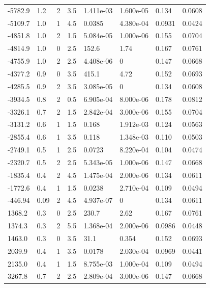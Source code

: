 \documentclass[preview]{standalone}
\begin{document}
{{\begin{tabular}{L{1.2cm}C{1.2cm} C{0.3cm}C{0.5cm} C{1.4cm}C{1.4cm} C{1.4cm}C{1.4cm}}
  -5782.9  &   1.2  & 2     & 3.5 &  1.411e-03  & 1.600e-05  & 0.134 &  0.0608   \\ 
  -5109.7  &   1.0  & 1     & 4.5 &  0.0385  & 4.380e-04  & 0.0931 &  0.0424   \\ 
  -4851.8  &   1.0  & 2     & 1.5 &  5.084e-05  & 1.000e-06  & 0.155 &  0.0704   \\ 
  -4814.9  &   1.0  & 0     & 2.5 &  152.6  & 1.74  & 0.167 &  0.0761   \\ 
  -4755.9  &   1.0  & 2     & 2.5 &  4.408e-06  & 0  & 0.147 &  0.0668   \\ 
  -4377.2  &   0.9  & 0     & 3.5 &  415.1  & 4.72  & 0.152 &  0.0693   \\ 
  -4285.5  &   0.9  & 2     & 3.5 &  3.085e-05  & 0  & 0.134 &  0.0608   \\ 
  -3934.5  &   0.8  & 2     & 0.5 &  6.905e-04  & 8.000e-06  & 0.178 &  0.0812   \\ 
  -3326.1  &   0.7  & 2     & 1.5 &  2.842e-04  & 3.000e-06  & 0.155 &  0.0704   \\ 
  -3131.2  &   0.6  & 1     & 1.5 &  0.168  & 1.912e-03  & 0.124 &  0.0563   \\ 
  -2855.4  &   0.6  & 1     & 3.5 &  0.118  & 1.348e-03  & 0.110 &  0.0503   \\ 
  -2749.1  &   0.5  & 1     & 2.5 &  0.0723  & 8.220e-04  & 0.104 &  0.0474   \\ 
  -2320.7  &   0.5  & 2     & 2.5 &  5.343e-05  & 1.000e-06  & 0.147 &  0.0668   \\ 
  -1835.4  &   0.4  & 2     & 4.5 &  1.475e-04  & 2.000e-06  & 0.134 &  0.0611   \\ 
  -1772.6  &   0.4  & 1     & 1.5 &  0.0238  & 2.710e-04  & 0.109 &  0.0494   \\ 
  -446.94  &  0.09  & 2     & 4.5 &  4.937e-07  & 0  & 0.134 &  0.0611   \\ 
  1368.2  &   0.3  & 0     & 2.5 &  230.7  & 2.62  & 0.167 &  0.0761   \\ 
  1374.3  &   0.3  & 2     & 5.5 &  1.368e-04  & 2.000e-06  & 0.0986 &  0.0448   \\ 
  1463.0  &   0.3  & 0     & 3.5 &  31.1  & 0.354  & 0.152 &  0.0693   \\ 
  2039.9  &   0.4  & 1     & 3.5 &  0.0178  & 2.030e-04  & 0.0969 &  0.0441   \\ 
  2135.0  &   0.4  & 1     & 1.5 &  8.755e-03  & 1.000e-04  & 0.109 &  0.0494   \\ 
  3267.8  &   0.7  & 2     & 2.5 &  2.809e-04  & 3.000e-06  & 0.147 &  0.0668   \\ 

\end{tabular}}}
\end{document}
